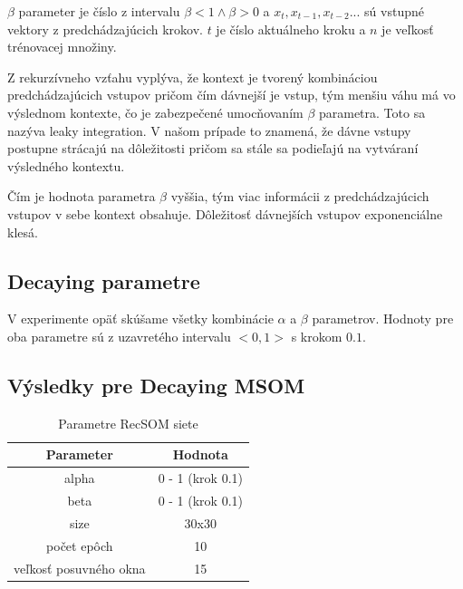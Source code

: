 $\beta$ parameter je číslo z intervalu $\beta < 1 \wedge \beta > 0$ a
$x_t, x_{t-1}, x_{t-2} ...$ sú vstupné vektory z predchádzajúcich krokov.
$t$ je číslo aktuálneho kroku a $n$ je veľkosť trénovacej množiny.

Z rekurzívneho vzťahu vyplýva, že kontext je tvorený kombináciou predchádzajúcich vstupov
pričom čím dávnejší je vstup, tým menšiu váhu má vo výslednom kontexte, čo je zabezpečené umocňovaním
$\beta$ parametra. Toto sa nazýva leaky integration. V našom prípade
to znamená, že dávne vstupy postupne strácajú na dôležitosti pričom sa stále sa podieľajú 
na vytváraní výsledného kontextu.

Čím je hodnota parametra $\beta$ vyššia, tým viac informácii z predchádzajúcich vstupov v sebe
kontext obsahuje. Dôležitosť dávnejších vstupov exponenciálne klesá.

\subsection{Decaying parametre}
V experimente opäť skúšame všetky kombinácie $\alpha$ a $\beta$ parametrov.
Hodnoty pre oba parametre sú z uzavretého intervalu $<0, 1>$ s krokom $0.1$.

\subsection{Výsledky pre Decaying MSOM}
\begin{table}[h!]
    \centering
    \begin{tabular}{|c|c|} 
     \hline
     Parameter & Hodnota \\ 
     \hline\hline
     alpha & 0 - 1 (krok 0.1)  \\ 
     \hline
     beta & 0 - 1  (krok 0.1) \\ 
     \hline
     size & 30x30  \\
     \hline
     počet epôch & 10  \\
     \hline
     veľkosť posuvného okna & 15 \\
     \hline
    \end{tabular}
    \caption{Parametre RecSOM siete}
    \label{table:1}
    \end{table}
    
